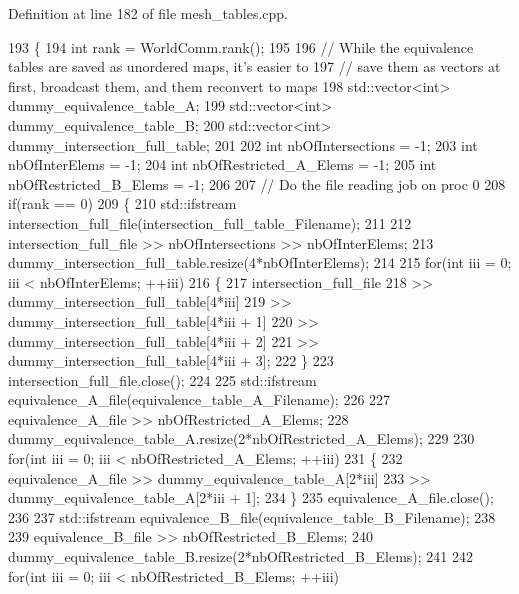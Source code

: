 Definition at line 182 of file mesh\+\_\+tables.\+cpp.


\begin{DoxyCode}
193 \{
194     \textcolor{keywordtype}{int} rank = WorldComm.rank();
195 
196     \textcolor{comment}{//  While the equivalence tables are saved as unordered maps, it's easier to}
197     \textcolor{comment}{// save them as vectors at first, broadcast them, and them reconvert to maps}
198     std::vector<int> dummy\_equivalence\_table\_A;
199     std::vector<int> dummy\_equivalence\_table\_B;
200     std::vector<int> dummy\_intersection\_full\_table;
201 
202     \textcolor{keywordtype}{int} nbOfIntersections = -1;
203     \textcolor{keywordtype}{int} nbOfInterElems = -1;
204     \textcolor{keywordtype}{int} nbOfRestricted\_A\_Elems = -1;
205     \textcolor{keywordtype}{int} nbOfRestricted\_B\_Elems = -1;
206 
207     \textcolor{comment}{// Do the file reading job on proc 0}
208     \textcolor{keywordflow}{if}(rank == 0)
209     \{
210         std::ifstream intersection\_full\_file(intersection\_full\_table\_Filename);
211 
212         intersection\_full\_file >> nbOfIntersections >> nbOfInterElems;
213         dummy\_intersection\_full\_table.resize(4*nbOfInterElems);
214 
215         \textcolor{keywordflow}{for}(\textcolor{keywordtype}{int} iii = 0; iii < nbOfInterElems; ++iii)
216         \{
217             intersection\_full\_file
218                 >> dummy\_intersection\_full\_table[4*iii]
219                 >> dummy\_intersection\_full\_table[4*iii + 1]
220                 >> dummy\_intersection\_full\_table[4*iii + 2]
221                 >> dummy\_intersection\_full\_table[4*iii + 3];
222         \}
223         intersection\_full\_file.close();
224 
225         std::ifstream equivalence\_A\_file(equivalence\_table\_A\_Filename);
226 
227         equivalence\_A\_file >> nbOfRestricted\_A\_Elems;
228         dummy\_equivalence\_table\_A.resize(2*nbOfRestricted\_A\_Elems);
229 
230         \textcolor{keywordflow}{for}(\textcolor{keywordtype}{int} iii = 0; iii < nbOfRestricted\_A\_Elems; ++iii)
231         \{
232             equivalence\_A\_file  >> dummy\_equivalence\_table\_A[2*iii]
233                                 >> dummy\_equivalence\_table\_A[2*iii + 1];
234         \}
235         equivalence\_A\_file.close();
236 
237         std::ifstream equivalence\_B\_file(equivalence\_table\_B\_Filename);
238 
239         equivalence\_B\_file >> nbOfRestricted\_B\_Elems;
240         dummy\_equivalence\_table\_B.resize(2*nbOfRestricted\_B\_Elems);
241 
242         \textcolor{keywordflow}{for}(\textcolor{keywordtype}{int} iii = 0; iii < nbOfRestricted\_B\_Elems; ++iii)

\end{DoxyCode}
